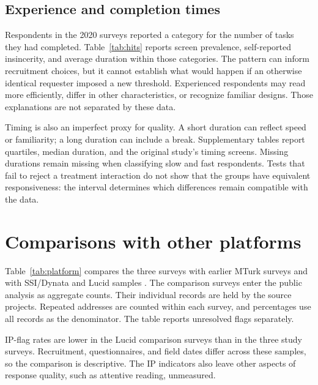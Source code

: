 \documentclass[11pt]{article}
\begin{document}
\subsection{Experience and completion times}

Respondents in the 2020 surveys reported a category for the number of tasks they had completed. Table~\ref{tab:hits} reports screen prevalence, self-reported insincerity, and average duration within those categories. The pattern can inform recruitment choices, but it cannot establish what would happen if an otherwise identical requester imposed a new threshold. Experienced respondents may read more efficiently, differ in other characteristics, or recognize familiar designs. Those explanations are not separated by these data.



Timing is also an imperfect proxy for quality. A short duration can reflect speed or familiarity; a long duration can include a break. Supplementary tables report quartiles, median duration, and the original study's timing screens. Missing durations remain missing when classifying slow and fast respondents. Tests that fail to reject a treatment interaction do not show that the groups have equivalent responsiveness: the interval determines which differences remain compatible with the data.

\section{Comparisons with other platforms}

Table~\ref{tab:platform} compares the three surveys with earlier MTurk surveys and with SSI/Dynata and Lucid samples \citep{ahler_broockman,coppock2019validating,graham_dk_2019,graham_corona_2020,thompson_busby_2020}. The comparison surveys enter the public analysis as aggregate counts. Their individual records are held by the source projects. Repeated addresses are counted within each survey, and percentages use all records as the denominator. The table reports unresolved flags separately.



IP-flag rates are lower in the Lucid comparison surveys than in the three study surveys. Recruitment, questionnaires, and field dates differ across these samples, so the comparison is descriptive. The IP indicators also leave other aspects of response quality, such as attentive reading, unmeasured.
\end{document}
